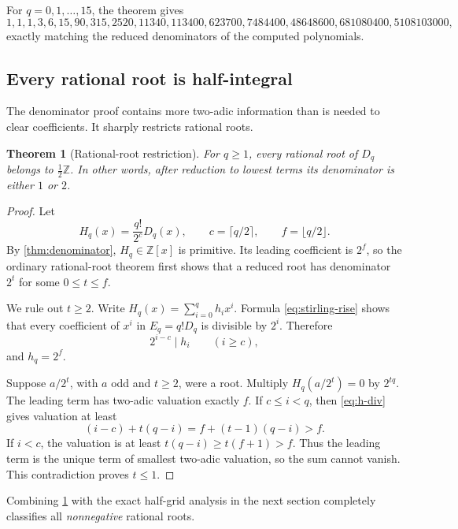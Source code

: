 \documentclass[11pt]{article}
\newtheorem{theorem}{Theorem}[section]
\theoremstyle{definition}
\theoremstyle{remark}
\newcommand{\Z}{\mathbb Z}
\newcommand{\Diag}{D}
\begin{document}
For \(q=0,1,\ldots,15\), the theorem gives
\[
 1,1,1,3,6,15,90,315,2520,11340,113400,623700,
 7484400,48648600,681080400,5108103000,
\]
exactly matching the reduced denominators of the computed polynomials.

\subsection{Every rational root is half-integral}

The denominator proof contains more two-adic information than is needed to
clear coefficients.  It sharply restricts rational roots.

\begin{theorem}[Rational-root restriction]\label{thm:rational-half}
For \(q\geq1\), every rational root of \(\Diag_q\) belongs to
\(\tfrac12\Z\).  In other words, after reduction to lowest terms its
denominator is either \(1\) or \(2\).
\end{theorem}

\begin{proof}
Let
\[
 H_q(x)=\frac{q!}{2^c}\Diag_q(x),
 \qquad c=\lceil q/2\rceil,
 \qquad f=\lfloor q/2\rfloor.
\]
By \cref{thm:denominator}, \(H_q\in\Z[x]\) is primitive.  Its leading
coefficient is \(2^f\), so the ordinary rational-root theorem first shows
that a reduced root has denominator \(2^t\) for some \(0\leq t\leq f\).

We rule out \(t\geq2\).  Write
\(H_q(x)=\sum_{i=0}^{q}h_ix^i\).  Formula
\cref{eq:stirling-rise} shows that every coefficient of \(x^i\) in
\(E_q=q!\Diag_q\) is divisible by \(2^i\).  Therefore
\begin{equation}
 2^{i-c}\mid h_i\qquad(i\geq c),                            \label{eq:h-div}
\end{equation}
and \(h_q=2^f\).

Suppose \(a/2^t\), with \(a\) odd and \(t\geq2\), were a root.  Multiply
\(H_q(a/2^t)=0\) by \(2^{tq}\).  The leading term has two-adic valuation
exactly \(f\).  If \(c\leq i<q\), then \cref{eq:h-div} gives valuation at
least
\[
 (i-c)+t(q-i)=f+(t-1)(q-i)>f.
\]
If \(i<c\), the valuation is at least
\(t(q-i)\geq t(f+1)>f\).  Thus the leading term is the unique term of
smallest two-adic valuation, so the sum cannot vanish.  This contradiction
proves \(t\leq1\).
\end{proof}

Combining \cref{thm:rational-half} with the exact half-grid analysis in the
next section completely classifies all \emph{nonnegative} rational roots.
\end{document}

